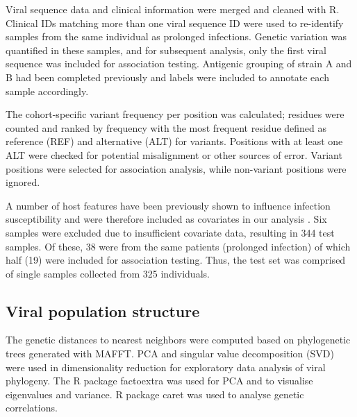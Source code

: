 \documentclass{article} %
\begin{document}
Viral sequence data and clinical information were merged and cleaned with R. Clinical IDs matching more than one viral sequence ID were used to re-identify samples from the same individual as prolonged infections. 
Genetic variation was quantified in these samples, and for subsequent analysis, only the first viral sequence was included for association testing. Antigenic grouping of strain A and B had been completed previously and labels were included to annotate each sample accordingly.

The cohort-specific variant frequency per position was calculated; residues were counted and ranked by frequency with the most frequent residue defined as reference (REF) and alternative (ALT) for variants. 
Positions with at least one ALT were checked for potential misalignment or other sources of error. 
Variant positions were selected for association analysis, while non-variant positions were ignored.

A number of host features have been previously shown to influence infection susceptibility and were therefore included as covariates in our analysis \citep{rosas2022upper}. 
Six samples were excluded due to insufficient covariate data, resulting in 344 test samples. 
Of these, 38 were from the same patients (prolonged infection) of which half (19) were included for association testing. 
Thus, the test set was comprised of single samples collected from 325 individuals.

\subsection{Viral population structure}
The genetic distances to nearest neighbors were computed based on phylogenetic trees generated with MAFFT. 
PCA and singular value decomposition (SVD) were used in dimensionality reduction for exploratory data analysis of viral phylogeny. 
The R package factoextra was used for PCA and to visualise eigenvalues and variance. R package caret was used to analyse genetic correlations. 
\end{document}
